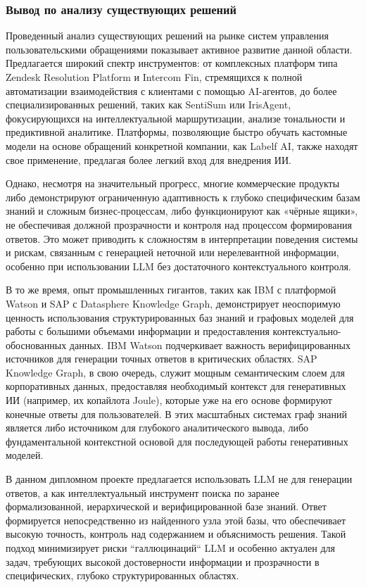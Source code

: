 

\subsubsection{Вывод по анализу существующих решений}

Проведенный анализ существующих решений на рынке систем управления пользовательскими обращениями показывает активное развитие данной области. Предлагается широкий спектр инструментов: от комплексных платформ типа Zendesk Resolution Platform и Intercom Fin, стремящихся к полной автоматизации взаимодействия с клиентами с помощью AI-агентов, до более специализированных решений, таких как SentiSum или IrisAgent, фокусирующихся на интеллектуальной маршрутизации, анализе тональности и предиктивной аналитике. Платформы, позволяющие быстро обучать кастомные модели на основе обращений конкретной компании, как Labelf AI, также находят свое применение, предлагая более легкий вход для внедрения ИИ.

Однако, несмотря на значительный прогресс, многие коммерческие продукты либо демонстрируют ограниченную адаптивность к глубоко специфическим базам знаний и сложным бизнес-процессам, либо функционируют как «чёрные ящики», не обеспечивая должной прозрачности и контроля над процессом формирования ответов. Это может приводить к сложностям в интерпретации поведения системы и рискам, связанным с генерацией неточной или нерелевантной информации, особенно при использовании LLM без достаточного контекстуального контроля.

В то же время, опыт промышленных гигантов, таких как IBM с платформой Watson и SAP с Datasphere Knowledge Graph, демонстрирует неоспоримую ценность использования структурированных баз знаний и графовых моделей для работы с большими объемами информации и предоставления контекстуально-обоснованных данных. IBM Watson подчеркивает важность верифицированных источников для генерации точных ответов в критических областях. SAP Knowledge Graph, в свою очередь, служит мощным семантическим слоем для корпоративных данных, предоставляя необходимый контекст для генеративных ИИ (например, их копайлота Joule), которые уже на его основе формируют конечные ответы для пользователей. В этих масштабных системах граф знаний является либо источником для глубокого аналитического вывода, либо фундаментальной контекстной основой для последующей работы генеративных моделей.

В данном дипломном проекте предлагается использовать LLM не для генерации ответов, а как интеллектуальный инструмент поиска по заранее формализованной, иерархической и верифицированной базе знаний. Ответ формируется непосредственно из найденного узла этой базы, что обеспечивает высокую точность, контроль над содержанием и объяснимость решения. Такой подход минимизирует риски ``галлюцинаций`` LLM и особенно актуален для задач, требующих высокой достоверности информации и прозрачности в специфических, глубоко структурированных областях.

